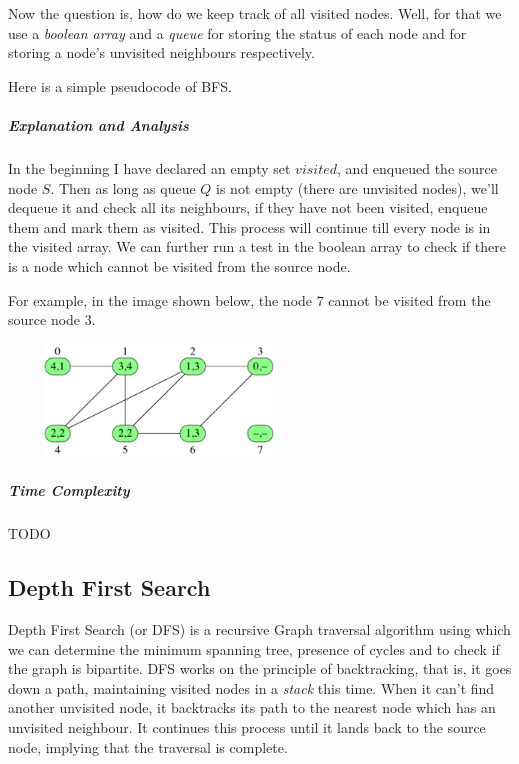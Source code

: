 \documentclass[11pt,a4paper]{extarticle}
\begin{document}
Now the question is, how do we keep track of all visited nodes. Well, for that we use a \textit{boolean array} and a \textit{queue} for storing the status of each node and for storing a node's unvisited neighbours respectively. 

Here is a simple pseudocode of BFS. 

\begin{adjustwidth}{2.5em}{0pt}

\end{adjustwidth}

\subparagraph{Explanation and Analysis}
In the beginning I have declared an empty set $visited$, and enqueued the source node $S$. Then as long as queue $Q$ is not empty (there are unvisited nodes), we'll dequeue it and check all its neighbours, if they have not been visited, enqueue them and mark them as visited. This process will continue till every node is in the visited array. We can further run a test in the boolean array to check if there is a node which cannot be visited from the source node.

For example, in the image shown below, the node 7 cannot be visited from the source node 3.

\begin{center}
	\includegraphics[width=8cm, height=3cm]{bfs}
\end{center}

\subparagraph{Time Complexity}
TODO

\subsection{Depth First Search}

Depth First Search (or DFS) is a recursive Graph traversal algorithm using which we can determine the minimum spanning tree, presence of cycles and to check if the graph is bipartite. DFS works on the principle of backtracking, that is, it goes down a path, maintaining visited nodes in a \textit{stack} this time. When it can't find another unvisited node, it backtracks its path to the nearest node which has an unvisited neighbour. It continues this process until it lands back to the source node, implying that the traversal is complete.


\begin{adjustwidth}{2.5em}{0pt}

\end{adjustwidth}
\end{document}
